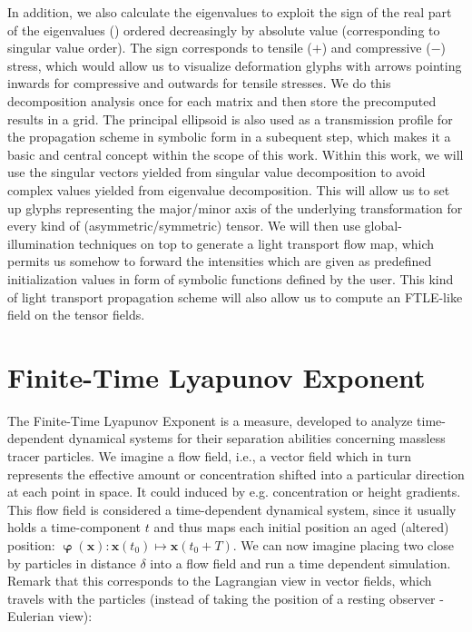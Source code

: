 \documentclass{scrartcl}
\begin{document}
In addition, we also calculate the eigenvalues to exploit the sign of the real part of the eigenvalues (\cite{mroz}) ordered decreasingly by absolute value (corresponding to singular value order). The sign corresponds to tensile ($+$) and compressive ($-$) stress, which would allow us to visualize deformation glyphs with arrows pointing inwards for compressive and outwards for tensile stresses. We do this decomposition analysis once for each matrix and then store the precomputed results in a grid. The principal ellipsoid is also used as a transmission profile for the propagation scheme in symbolic form in a subequent step, which makes it a basic and central concept within the scope of this work. Within this work, we will use the singular vectors yielded from singular value decomposition to avoid complex values yielded from eigenvalue decomposition. This will allow us to set up glyphs representing the major/minor axis of the underlying transformation for every kind of (asymmetric/symmetric) tensor. We will then use global-illumination techniques on top to generate a light transport flow map, which permits us somehow to forward the intensities which are given as predefined initialization values in form of symbolic functions defined by the user. This kind of light transport propagation scheme will also allow us to compute an FTLE-like field on the tensor fields.

\section{Finite-Time Lyapunov Exponent}
\label{sec:ftle}
The Finite-Time Lyapunov Exponent is a measure, developed to analyze time-dependent dynamical systems for their separation abilities concerning massless tracer particles. We imagine a flow field, i.e., a vector field which in turn represents the effective amount or concentration shifted into a particular direction at each point in space. It could induced by e.g. concentration or height gradients. This flow field is considered a time-dependent dynamical system, since it usually holds a time-component $t$ and thus maps each initial position an aged (altered) position: $\mathbf{\upvarphi}(\mathbf{x}) : \mathbf{x}(t_0) \longmapsto \mathbf{x}(t_0+T)$. We can now imagine placing two close by particles in distance $\delta$ into a flow field and run a time dependent simulation. Remark that this corresponds to the Lagrangian view in vector fields, which travels with the particles (instead of taking the position of a resting observer - Eulerian view):
\end{document}
